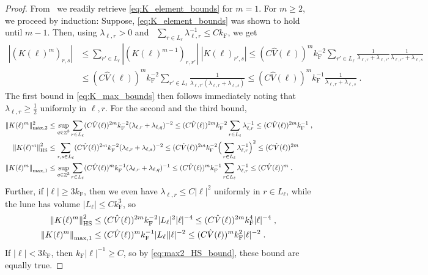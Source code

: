 \documentclass[12pt,a4paper]{article}
\numberwithin{equation}{section}
\newcommand{\1}{\mathbb{I}}
\newcommand{\F}{\mathrm{F}}
\newcommand{\HS}{\mathrm{HS}}
\DeclareMathOperator{\Z}{\mathbb{Z}}
\newcommand{\normmaxi}[1]{\norm{#1}_{\mathrm{max,1}}}
\theoremstyle{plain}
\theoremstyle{definition}
\theoremstyle{remark}
\theoremstyle{plain}
\theoremstyle{definition}
\theoremstyle{remark}
\begin{document}
\begin{proof}
From~\cite[Prop.~7.10]{CHN23} we readily retrieve \eqref{eq:K_element_bounds} for $ m = 1 $. For $ m \ge 2 $, we proceed by induction: Suppose, \eqref{eq:K_element_bounds} was shown to hold until $ m-1 $. Then, using $ \lambda_{\ell,r} > 0 $ and~\cite[Prop.~A.2]{CHN21} $ \sum_{r \in L_\ell} \lambda_{\ell,r}^{-1} \le C k_{\F} $, we get
\begin{equation}
	\begin{aligned}
		|(K(\ell)^m)_{r,s}|
		&\le \sum_{r' \in L_\ell}
		|(K(\ell)^{m-1})_{r,r'}| \;
		|K(\ell)_{r',s}|
		\le (C \hat{V}(\ell))^m k_{\F}^{-2} \sum_{r' \in L_\ell}
		\frac{1}{\lambda_{\ell, r} + \lambda_{\ell, r'}}
		\frac{1}{\lambda_{\ell, r'} + \lambda_{\ell, s}} \\
		&\le (C \hat{V}(\ell))^m k_{\F}^{-2} \sum_{r' \in L_\ell}
		\frac{1}{\lambda_{\ell, r'} (\lambda_{\ell, r} + \lambda_{\ell, s})}
		\le (C \hat{V}(\ell))^m k_{\F}^{-1}
		\frac{1}{\lambda_{\ell, r} + \lambda_{\ell, s}} \;.
	\end{aligned}
\end{equation}
The first bound in \eqref{eq:K_max_bounds} then follows immediately noting that $ \lambda_{\ell,r} \ge \frac 12 $ uniformly in $ \ell, r $. For the second and the third bound,
\begin{equation} \label{eq:max2_HS_bound}
\begin{aligned}
	\Vert K(\ell)^m \Vert_{\max,2}^2
	&\le \sup_{q \in \Z^3} \sum_{r \in L_\ell} (C \hat{V}(\ell))^{2m} k_{\F}^{-2} (\lambda_{\ell,r} + \lambda_{\ell,q})^{-2}
	\le (C \hat{V}(\ell))^{2m} k_{\F}^{-2} \sum_{r \in L_\ell} \lambda_{\ell,r}^{-1}
	\le (C \hat{V}(\ell))^{2m} k^{-1}_{\F} \;, \\
	\norm{K(\ell)^m}_{\HS}^2
	&\le \sum_{r,s \in L_\ell} (C \hat{V}(\ell))^{2m} k_{\F}^{-2} (\lambda_{\ell,r} + \lambda_{\ell,s})^{-2}
	\le (C \hat{V}(\ell))^{2m} k_{\F}^{-2} \Big( \sum_{r \in L_\ell}  \lambda_{\ell,r}^{-1} \Big)^2
	\le (C \hat{V}(\ell))^{2m} \; \\
	\normmaxi{K(\ell)^m} 
	&\leq \sup_{q \in \Z^3} \sum_{r \in L_\ell} (C \hat{V}(\ell))^{m} k_{\F}^{-1} (\lambda_{\ell,r} + \lambda_{\ell,q})^{-1} \le (C \hat{V}(\ell))^{m} k_{\F}^{-1} \sum_{r \in L_\ell} \lambda_{\ell,r}^{-1} \leq (C \hat{V}(\ell))^{m} \;.
\end{aligned}
\end{equation}
Further, if $ |\ell| \ge 3 k_{\F} $, then we even have $ \lambda_{\ell,r} \le C |\ell|^2 $ uniformly in $ r \in L_\ell $, while the lune has volume $ |L_\ell| \le C k_{\F}^3 $, so
\begin{align}
	\norm{K(\ell)^m}_{\HS}^2
	&\le (C \hat{V}(\ell))^{2m} k_{\F}^{-2} |L_\ell|^2 |\ell|^{-4}
	\le (C \hat{V}(\ell))^{2m} k_{\F}^4 |\ell|^{-4} \;,\\
	\norm{K(\ell)^m}_{\mathrm{max,1}}
	&\le (C \hat{V}(\ell))^{m} k_{\F}^{-1} |L_\ell| |\ell|^{-2}
	\le (C \hat{V}(\ell))^{m} k_{\F}^2 |\ell|^{-2} \;.
\end{align}
If $ |\ell| < 3 k_{\F} $, then $ k_{\F} |\ell|^{-1} \ge C $, so by \eqref{eq:max2_HS_bound}, these bound are equally true.
\end{proof}
\end{document}
